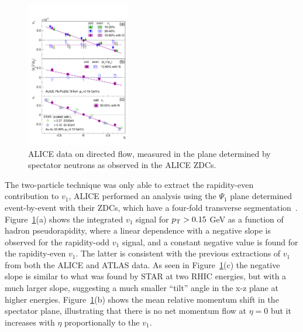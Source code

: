 \begin{figure}[!tb]
\begin{center}
\includegraphics[width=0.4\textwidth]{flowcorrelations_figs/paper_v1_midrapidity_spectators_Figure2.pdf}
\caption[]{ALICE data on directed flow, measured in the plane determined by spectator neutrons
as observed in the ALICE ZDCs.}
\label{fig:pas:fc:v1b}
\end{center}
\end{figure}

The two-particle technique was only able to extract the rapidity-even contribution to $v_1$,
ALICE performed an analysis using the $\Psi_1$ plane determined event-by-event with their
ZDCs, which have a four-fold transverse segmentation~\cite{Abelev:2013cva}.
Figure~\ref{fig:pas:fc:v1b}(a) shows the integrated $v_1$ signal for $\mbox{$p_{\mathrm{T}}$}>0.15$ GeV as a
function of hadron pseudorapidity, where a linear dependence with a negative slope is observed
for the rapidity-odd $v_1$ signal, and a constant negative value is found for the rapidity-even
$v_1$.  The latter is consistent with the previous extractions of $v_1$ from both the ALICE
and ATLAS data.
As seen in Figure~\ref{fig:pas:fc:v1b}(c) the negative slope is similar to what was found by STAR at
two RHIC energies, but with a much larger slope, suggesting a much smaller ``tilt'' angle
in the x-z plane at higher energies.
Figure~\ref{fig:pas:fc:v1b}(b) shows the mean relative momentum shift in the spectator plane, illustrating
that there is no net momentum flow at $\eta=0$ but it increases with $\eta$ proportionally
to the $v_1$.

